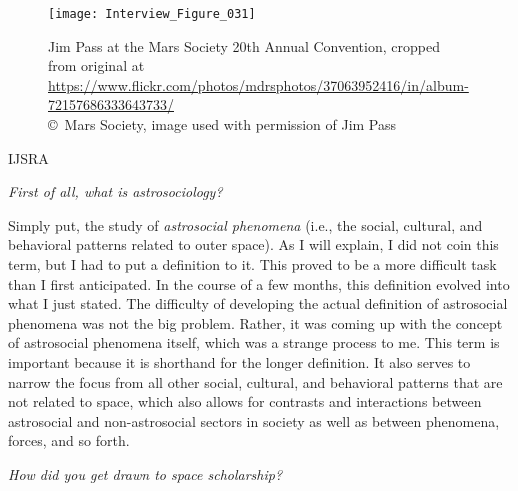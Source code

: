 \begin{figure}[!tb]
	\texttt{[image: Interview\_Figure\_031]}
	\centering
	\caption{Jim Pass at the Mars Society 20th Annual Convention, cropped from original at	\url{https://www.flickr.com/photos/mdrsphotos/37063952416/in/album-72157686333643733/}
		{\normalfont\scriptsize \\ \copyright\ Mars Society, image used with permission of Jim Pass
	}}
	\label{Interview_Figure_031}
\end{figure}

\begin{labeling}{IJSRA}
	\item[IJSRA (International Journal of Student Research in Archaeology)] \emph{First of all, what is \emph{astrosociology}?}

	\item[Jim Pass (JP)] Simply put, the study of \emph{astrosocial phenomena} (i.e., the social, cultural, and behavioral patterns related to outer space). As I will explain, I did not coin this term, but I had to put a definition to it. This proved to be a more difficult task than I first anticipated. In the course of a few months, this definition evolved into what I just stated. The difficulty of developing the actual definition of astrosocial phenomena was not the big problem. Rather, it was coming up with the concept of astrosocial phenomena itself, which was a strange process to me. This term is important because it is shorthand for the longer definition. It also serves to narrow the focus from all other social, cultural, and behavioral patterns that are not related to space, which also allows for contrasts and interactions between astrosocial and non-astrosocial sectors in society as well as between phenomena, forces, and so forth.

	\item[IJSRA] \emph{How did you get drawn to space scholarship?}


\end{labeling}
